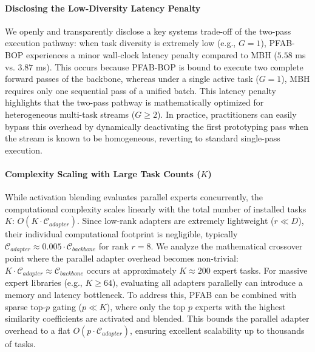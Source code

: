 \paragraph{Disclosing the Low-Diversity Latency Penalty}
We openly and transparently disclose a key systems trade-off of the two-pass execution pathway: when task diversity is extremely low (e.g., $G=1$), \textsc{PFAB-BOP} experiences a minor wall-clock latency penalty compared to MBH ($5.58$ ms vs. $3.87$ ms). This occurs because \textsc{PFAB-BOP} is bound to execute two complete forward passes of the backbone, whereas under a single active task ($G=1$), MBH requires only one sequential pass of a unified batch. This latency penalty highlights that the two-pass pathway is mathematically optimized for heterogeneous multi-task streams ($G \ge 2$). In practice, practitioners can easily bypass this overhead by dynamically deactivating the first prototyping pass when the stream is known to be homogeneous, reverting to standard single-pass execution.

\paragraph{Complexity Scaling with Large Task Counts ($K$)}
While activation blending evaluates parallel experts concurrently, the computational complexity scales linearly with the total number of installed tasks $K$: $O(K \cdot \mathcal{C}_{adapter})$. Since low-rank adapters are extremely lightweight ($r \ll D$), their individual computational footprint is negligible, typically $\mathcal{C}_{adapter} \approx 0.005 \cdot \mathcal{C}_{backbone}$ for rank $r=8$. We analyze the mathematical crossover point where the parallel adapter overhead becomes non-trivial: $K \cdot \mathcal{C}_{adapter} \approx \mathcal{C}_{backbone}$ occurs at approximately $K \approx 200$ expert tasks. For massive expert libraries (e.g., $K \ge 64$), evaluating all adapters parallelly can introduce a memory and latency bottleneck. To address this, PFAB can be combined with sparse top-$p$ gating ($p \ll K$), where only the top $p$ experts with the highest similarity coefficients are activated and blended. This bounds the parallel adapter overhead to a flat $O(p \cdot \mathcal{C}_{adapter})$, ensuring excellent scalability up to thousands of tasks.

